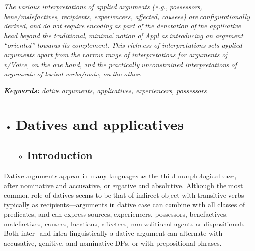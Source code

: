 \documentclass[output=paper,modfonts,nonflat]{langsci/langscibook}
\begin{document}
\textit{The} \textit{various} \textit{interpretations} \textit{of} \textit{applied} \textit{arguments} \textit{(e.g.,} \textit{possessors,} \textit{bene/malefactives,} \textit{recipients,} \textit{experiencers,} \textit{affected,} \textit{causees)} \textit{are} \textit{configurationally} \textit{derived,} \textit{and} \textit{do} \textit{not} \textit{require} \textit{encoding} \textit{as} \textit{part} \textit{of} \textit{the} \textit{denotation} \textit{of} \textit{the} \textit{applicative} \textit{head} \textit{beyond} \textit{the} \textit{traditional,} \textit{minimal} \textit{notion} \textit{of} \textit{Appl} \textit{as} \textit{introducing} \textit{an} \textit{argument} \textit{“oriented”} \textit{towards} \textit{its} \textit{complement.} \textit{This} \textit{richness} \textit{of} \textit{interpretations} \textit{sets} \textit{applied} \textit{arguments} \textit{apart} \textit{from} \textit{the} \textit{narrow} \textit{range} \textit{of} \textit{interpretations} \textit{for} \textit{arguments} \textit{of} \textit{v/Voice,} \textit{on} \textit{the} \textit{one} \textit{hand,} \textit{and} \textit{the} \textit{practically} \textit{unconstrained} \textit{interpretations} \textit{of} \textit{arguments} \textit{of} \textit{lexical} \textit{verbs/roots,} \textit{on} \textit{the} \textit{other.} 

\textbf{\textit{Keywords:} } \textit{dative} \textit{arguments,} \textit{applicatives,} \textit{experiencers,} \textit{possessors}

\begin{itemize}
\item \section{Datives and applicatives}

\begin{itemize}
\item \subsection{Introduction}
\end{itemize}
\end{itemize}

Dative arguments appear in many languages as the third morphological case, after nominative and accusative, or ergative and absolutive. Although the most common role of datives seems to be that of indirect object with transitive verbs—typically as recipients—arguments in dative case can combine with all classes of predicates, and can express sources, experiencers, possessors, benefactives, malefactives, causees, locations, affectees, non-volitional agents or dispositionals. Both inter- and intra-linguistically a dative argument can alternate with accusative, genitive, and nominative DPs, or with prepositional phrases. 
\end{document}
